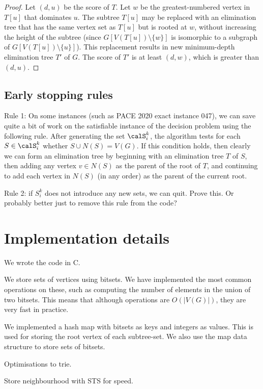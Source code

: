 \begin{proof}
Let $(d,u)$ be the score of $T$.
Let $w$ be the greatest-numbered vertex in $T[u]$ that dominates $u$.
The subtree $T[u]$ may be replaced with an elimination tree that has the
same vertex set as $T[u]$ but is rooted at $w$, without increasing the height of the
subtree (since $G[V(T[u]) \setminus \{w\}]$
is isomorphic to a subgraph of $G[V(T[u]) \setminus \{u\}]$).
This replacement results in new minimum-depth elimination tree $T'$ of
$G$. The score of $T'$ is at least $(d, w)$, which is greater than $(d,u)$.
\end{proof}

\subsection{Early stopping rules}

Rule 1: On some instances (such as PACE 2020 exact instance 047), we can save quite a bit of work
on the satisfiable instance of the decision problem using the following rule.  After
generating the set $\calS_i^k$, the algorithm tests for each $S \in \calS_i^k$
whether $S \cup N(S) = V(G)$.  If this condition holds, then clearly we can form
an elimination tree by beginning with an elimination tree $T$ of $S$, then adding any vertex
$v \in N(S)$ as the parent of the root of $T$, and continuing to add each vertex
in $N(S)$ (in any order) as the parent of the current root.

Rule 2: if $S_i^k$ does not introduce any new sets, we can quit.  Prove this.  Or probably
better just to remove this rule from the code?

\section{Implementation details}\label{sec:implementation}

We wrote the code in C.

We store sets of vertices using bitsets.  We have implemented the most common operations
on these, such as computing the number of elements in the union of two bitsets.  This
means that although operations are $O(|V(G)|)$, they are very fast in practice.

We implemented a hash map with bitsets as keys and integers as values.
This is used for storing the root vertex of each subtree-set.  We also use the map data
structure to store sets of bitsets.

Optimisations to trie.

Store neighbourhood with STS for speed.

